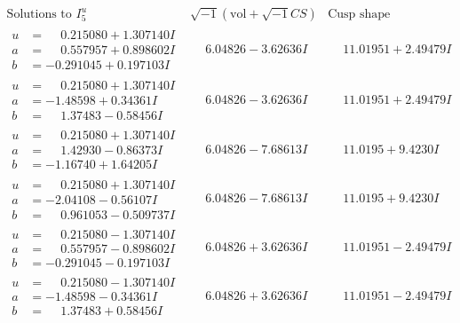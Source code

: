 \documentclass[1p]{elsarticle_modified}
\theoremstyle{definition}
\newcommand{\I}{\sqrt{-1}}
\begin{document}
$$\begin{array}{c|c|c}  
\text{Solutions to }I^u_{5}& \I (\text{vol} + \sqrt{-1}CS) & \text{Cusp shape}\\
 \hline 
\begin{aligned}
u &= \phantom{-}0.215080 + 1.307140 I \\
a &= \phantom{-}0.557957 + 0.898602 I \\
b &= -0.291045 + 0.197103 I\end{aligned}
 & \phantom{-}6.04826 - 3.62636 I & \phantom{-}11.01951 + 2.49479 I \\ \hline\begin{aligned}
u &= \phantom{-}0.215080 + 1.307140 I \\
a &= -1.48598 + 0.34361 I \\
b &= \phantom{-}1.37483 - 0.58456 I\end{aligned}
 & \phantom{-}6.04826 - 3.62636 I & \phantom{-}11.01951 + 2.49479 I \\ \hline\begin{aligned}
u &= \phantom{-}0.215080 + 1.307140 I \\
a &= \phantom{-}1.42930 - 0.86373 I \\
b &= -1.16740 + 1.64205 I\end{aligned}
 & \phantom{-}6.04826 - 7.68613 I & \phantom{-}11.0195 + 9.4230 I \\ \hline\begin{aligned}
u &= \phantom{-}0.215080 + 1.307140 I \\
a &= -2.04108 - 0.56107 I \\
b &= \phantom{-}0.961053 - 0.509737 I\end{aligned}
 & \phantom{-}6.04826 - 7.68613 I & \phantom{-}11.0195 + 9.4230 I \\ \hline\begin{aligned}
u &= \phantom{-}0.215080 - 1.307140 I \\
a &= \phantom{-}0.557957 - 0.898602 I \\
b &= -0.291045 - 0.197103 I\end{aligned}
 & \phantom{-}6.04826 + 3.62636 I & \phantom{-}11.01951 - 2.49479 I \\ \hline\begin{aligned}
u &= \phantom{-}0.215080 - 1.307140 I \\
a &= -1.48598 - 0.34361 I \\
b &= \phantom{-}1.37483 + 0.58456 I\end{aligned}
 & \phantom{-}6.04826 + 3.62636 I & \phantom{-}11.01951 - 2.49479 I \\ \hline\begin{aligned}

\end{aligned}
\end{array}$$
\end{document}
